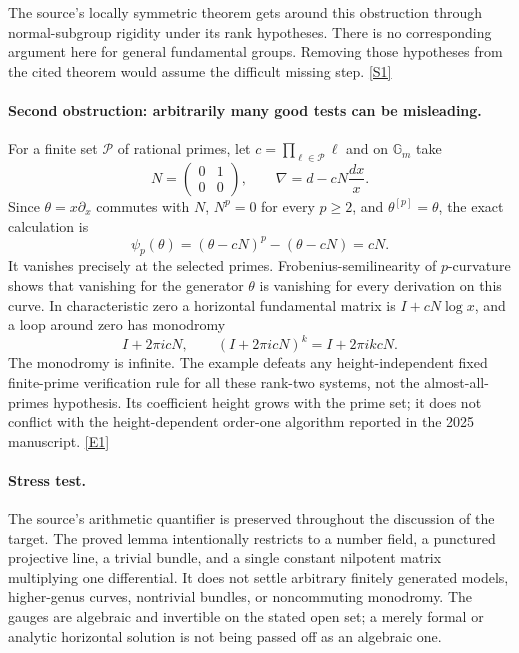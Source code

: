 \documentclass[11pt,a4paper]{article}
\newcommand{\sref}[2]{\hyperlink{source:#1:#2}{[S#2]}}
\newcommand{\eref}[2]{\hyperlink{extra:#1:#2}{[E#2]}}
\numberwithin{equation}{section}
\begin{document}
The source's locally symmetric theorem gets around this obstruction through
normal-subgroup rigidity under its rank hypotheses. There is no corresponding
argument here for general fundamental groups. Removing those hypotheses
from the cited theorem would assume the difficult missing step.
\sref{statement}{1}

\paragraph{Second obstruction: arbitrarily many good tests can be misleading.}
For a finite set $\mathcal P$ of rational primes, let
$c=\prod_{\ell\in\mathcal P}\ell$ and on $\mathbb G_m$ take
\[
 N=\begin{pmatrix}0&1\\0&0\end{pmatrix},\qquad
 \nabla=d-cN\frac{dx}{x}.
\]
Since $\theta=x\partial_x$ commutes with $N$, $N^p=0$ for every $p\ge2$, and
$\theta^{[p]}=\theta$, the exact calculation is
\begin{equation}\label{statement:finite-test}
 \psi_p(\theta)=(\theta-cN)^p-(\theta-cN)=cN.
\end{equation}
It vanishes precisely at the selected primes. Frobenius-semilinearity of
$p$-curvature shows that vanishing for the generator $\theta$ is vanishing
for every derivation on this curve. In characteristic zero a horizontal
fundamental matrix is $I+cN\log x$, and a loop around zero has monodromy
\[
 I+2\pi i cN,
 \qquad (I+2\pi i cN)^k=I+2\pi i k cN.
\]
The monodromy is infinite. The example defeats any height-independent fixed
finite-prime verification rule for all these rank-two systems, not the
almost-all-primes hypothesis. Its coefficient height grows with the prime
set; it does not conflict with the height-dependent order-one algorithm
reported in the 2025 manuscript. \eref{statement}{1}

\paragraph{Stress test.}
The source's arithmetic quantifier is preserved throughout the discussion
of the target. The proved lemma intentionally restricts to a number field,
a punctured projective line, a trivial bundle, and a single constant nilpotent
matrix multiplying one differential. It does not settle arbitrary
finitely generated models, higher-genus curves, nontrivial bundles, or
noncommuting monodromy. The gauges are algebraic and invertible on the
stated open set; a merely formal or analytic horizontal solution is not
being passed off as an algebraic one.
\end{document}
